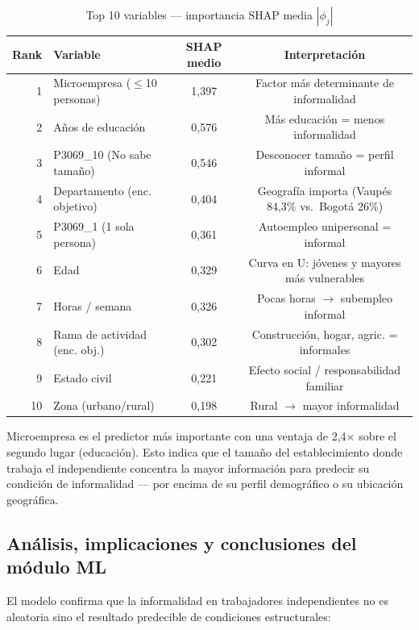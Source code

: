 \documentclass[12pt, a4paper]{article}
\begin{document}
\begin{table}[H]
\centering
\caption{Top 10 variables — importancia SHAP media $|\phi_j|$}
\label{tab:shap}
\begin{tabular}{rlcc}
\toprule
\textbf{Rank} & \textbf{Variable} & \textbf{SHAP medio} & \textbf{Interpretación} \\
\midrule
1 & Microempresa ($\leq$10 personas) & 1{,}397 & Factor más determinante de informalidad \\
2 & Años de educación & 0{,}576 & Más educación = menos informalidad \\
3 & P3069\_10 (No sabe tamaño) & 0{,}546 & Desconocer tamaño = perfil informal \\
4 & Departamento (enc. objetivo) & 0{,}404 & Geografía importa (Vaupés 84{,}3\% vs.\ Bogotá 26\%) \\
5 & P3069\_1 (1 sola persona) & 0{,}361 & Autoempleo unipersonal = informal \\
6 & Edad & 0{,}329 & Curva en U: jóvenes y mayores más vulnerables \\
7 & Horas / semana & 0{,}326 & Pocas horas $\to$ subempleo informal \\
8 & Rama de actividad (enc. obj.) & 0{,}302 & Construcción, hogar, agric. = informales \\
9 & Estado civil & 0{,}221 & Efecto social / responsabilidad familiar \\
10 & Zona (urbano/rural) & 0{,}198 & Rural $\to$ mayor informalidad \\
\bottomrule
\end{tabular}
\end{table}

\begin{hallazgo}
Microempresa es el predictor más importante con una ventaja de 2{,}4× sobre el
segundo lugar (educación). Esto indica que el tamaño del establecimiento donde trabaja
el independiente concentra la mayor información para predecir su condición de
informalidad — por encima de su perfil demográfico o su ubicación geográfica.
\end{hallazgo}

\subsection{Análisis, implicaciones y conclusiones del módulo ML}

El modelo confirma que la informalidad en trabajadores independientes no es aleatoria
sino el resultado predecible de condiciones estructurales:
\end{document}
